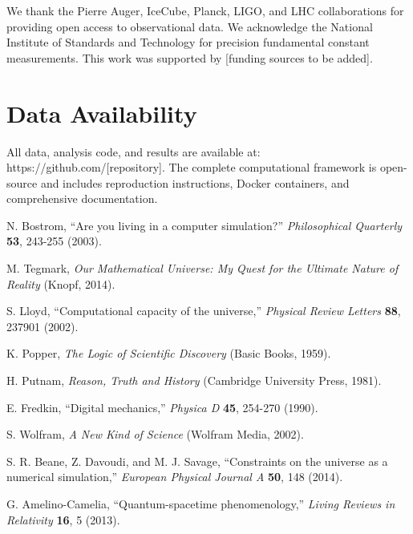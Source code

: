 \documentclass[12pt,a4paper]{article}
\begin{document}
We thank the Pierre Auger, IceCube, Planck, LIGO, and LHC collaborations for providing open access to observational data. We acknowledge the National Institute of Standards and Technology for precision fundamental constant measurements. This work was supported by [funding sources to be added].

\section*{Data Availability}

All data, analysis code, and results are available at: https://github.com/[repository]. The complete computational framework is open-source and includes reproduction instructions, Docker containers, and comprehensive documentation.

\begin{thebibliography}{99}

N. Bostrom, ``Are you living in a computer simulation?'' \textit{Philosophical Quarterly} \textbf{53}, 243-255 (2003).

M. Tegmark, \textit{Our Mathematical Universe: My Quest for the Ultimate Nature of Reality} (Knopf, 2014).

S. Lloyd, ``Computational capacity of the universe,'' \textit{Physical Review Letters} \textbf{88}, 237901 (2002).

K. Popper, \textit{The Logic of Scientific Discovery} (Basic Books, 1959).

H. Putnam, \textit{Reason, Truth and History} (Cambridge University Press, 1981).

E. Fredkin, ``Digital mechanics,'' \textit{Physica D} \textbf{45}, 254-270 (1990).

S. Wolfram, \textit{A New Kind of Science} (Wolfram Media, 2002).

S. R. Beane, Z. Davoudi, and M. J. Savage, ``Constraints on the universe as a numerical simulation,'' \textit{European Physical Journal A} \textbf{50}, 148 (2014).

G. Amelino-Camelia, ``Quantum-spacetime phenomenology,'' \textit{Living Reviews in Relativity} \textbf{16}, 5 (2013).

\end{thebibliography}
\end{document}
